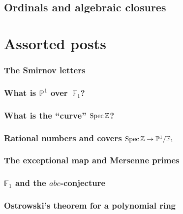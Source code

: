 \documentclass[a4paper]{memoir}
\begin{document}
\chapter{Ordinals and algebraic closures}




\part{Assorted posts}

\setcounter{section}{0}

\section{The Smirnov letters}


\section{What is $\mathbb{P}^1$ over~$\mathbb{F}_1$?}


\section{What is the ``curve'' $\operatorname{Spec}\mathbb{Z}$?}


\section{Rational numbers and covers $\operatorname{Spec}\mathbb{Z}\to\mathbb{P}^1/\mathbb{F}_1$}


\section{The exceptional map and Mersenne primes}


\section{$\mathbb{F}_1$ and the $abc$-conjecture}


\section{Ostrowski's theorem for a polynomial ring}

\end{document}
